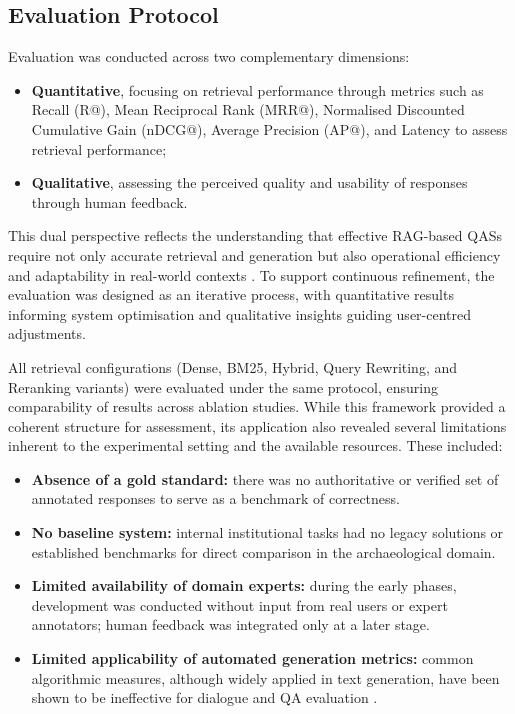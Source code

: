 \begin{spacing}{1.5}
\section{Evaluation Protocol}\label{sec:evaluation_protocol}
Evaluation was conducted across two complementary dimensions: 
\begin{itemize}
      \item \textbf{Quantitative}, focusing on retrieval performance through metrics such as Recall (R@), Mean Reciprocal Rank (MRR@), Normalised Discounted Cumulative Gain (nDCG@), Average Precision (AP@), and Latency to assess retrieval performance;
      \item \textbf{Qualitative}, assessing the perceived quality and usability of responses through human feedback.
\end{itemize}

This dual perspective reflects the understanding that effective RAG-based QASs require not only accurate retrieval and generation but also operational efficiency and adaptability in real-world contexts \citep{akkiraju_facts_2024}. To support continuous refinement, the evaluation was designed as an iterative process, with quantitative results informing system optimisation and qualitative insights guiding user-centred adjustments.

All retrieval configurations (Dense, BM25, Hybrid, Query Rewriting, and Reranking variants) were evaluated under the same protocol, ensuring comparability of results across ablation studies. While this framework provided a coherent structure for assessment, its application also revealed several limitations inherent to the experimental setting and the available resources. These included:
\begin{itemize}
      \item \textbf{Absence of a gold standard:} there was no authoritative or verified set of annotated responses to serve as a benchmark of correctness.
      \item \textbf{No baseline system:} internal institutional tasks had no legacy solutions or established benchmarks for direct comparison in the archaeological domain.
      \item \textbf{Limited availability of domain experts:} during the early phases, development was conducted without input from real users or expert annotators; human feedback was integrated only at a later stage.
      \item \textbf{Limited applicability of automated generation metrics:} common algorithmic measures, although widely applied in text generation, have been shown to be ineffective for dialogue and QA evaluation \citep{deriu_survey_2020,liu_how_2016}.
\end{itemize}


\end{spacing}
